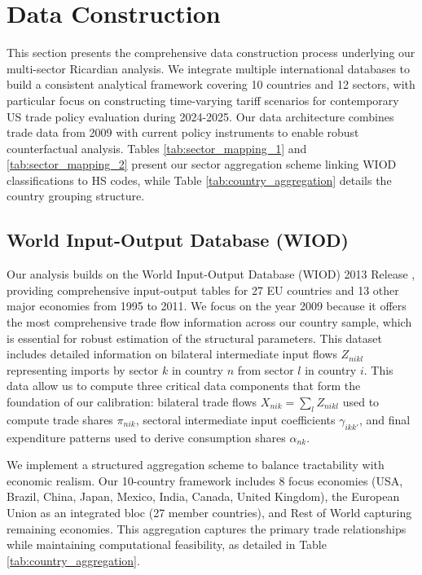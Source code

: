 \section{Data Construction}

This section presents the comprehensive data construction process underlying our multi-sector Ricardian analysis. We integrate multiple international databases to build a consistent analytical framework covering 10 countries and 12 sectors, with particular focus on constructing time-varying tariff scenarios for contemporary US trade policy evaluation during 2024-2025. Our data architecture combines trade data from 2009 with current policy instruments to enable robust counterfactual analysis. Tables \ref{tab:sector_mapping_1} and \ref{tab:sector_mapping_2} present our sector aggregation scheme linking WIOD classifications to HS codes, while Table \ref{tab:country_aggregation} details the country grouping structure.

\subsection{World Input-Output Database (WIOD)}

Our analysis builds on the World Input-Output Database (WIOD) 2013 Release \citep{timmer2015illustrated}, providing comprehensive input-output tables for 27 EU countries and 13 other major economies from 1995 to 2011. We focus on the year 2009 because it offers the most comprehensive trade flow information across our country sample, which is essential for robust estimation of the structural parameters. This dataset includes detailed information on bilateral intermediate input flows $Z_{nikl}$ representing imports by sector $k$ in country $n$ from sector $l$ in country $i$. This data allow us to compute three critical data components that form the foundation of our calibration: bilateral trade flows $X_{nik} = \sum_{l} Z_{nikl}$ used to compute trade shares $\pi_{nik}$, sectoral intermediate input coefficients $\gamma_{ikk'}$, and final expenditure patterns used to derive consumption shares $\alpha_{nk}$.

We implement a structured aggregation scheme to balance tractability with economic realism. Our 10-country framework includes 8 focus economies (USA, Brazil, China, Japan, Mexico, India, Canada, United Kingdom), the European Union as an integrated bloc (27 member countries), and Rest of World capturing remaining economies. This aggregation captures the primary trade relationships while maintaining computational feasibility, as detailed in Table \ref{tab:country_aggregation}. 

